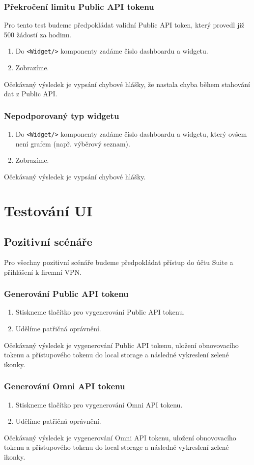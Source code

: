 \documentclass[czech, bc, kiv, he, iso690numb]{fasthesis}
\begin{document}
\subsubsection{Překročení limitu Public API tokenu}
Pro tento test budeme předpokládat validní Public API token, který provedl již 500 žádostí za hodinu.
\begin{enumerate}
	\item Do \texttt{<Widget/>} komponenty zadáme číslo dashboardu a widgetu.
	\item Zobrazíme.
\end{enumerate}
Očekávaný výsledek je vypsání chybové hlášky, že nastala chyba během stahování dat z Public API.

\subsubsection{Nepodporovaný typ widgetu}
\begin{enumerate}
	\item Do \texttt{<Widget/>} komponenty zadáme číslo dashboardu a widgetu, který ovšem není grafem (např. výběrový seznam).
	\item Zobrazíme.
\end{enumerate}
Očekávaný výsledek je vypsání chybové hlášky.

\section{Testování UI}
\subsection{Pozitivní scénáře}
Pro všechny pozitivní scénáře budeme předpokládat přístup do účtu Suite a přihlášení k firemní VPN.
\subsubsection{Generování Public API tokenu}
\begin{enumerate}
	\item Stiskneme tlačítko pro vygenerování Public API tokenu.
	\item Udělíme patřičná oprávnění.
\end{enumerate}
Očekávaný výsledek je vygenerování Public API tokenu, uložení obnovovacího tokenu a přístupového tokenu do local storage a následné vykreslení zelené ikonky.

\subsubsection{Generování Omni API tokenu}
\begin{enumerate}
	\item Stiskneme tlačítko pro vygenerování Omni API tokenu.
	\item Udělíme patřičná oprávnění.
\end{enumerate}
Očekávaný výsledek je vygenerování Omni API tokenu, uložení obnovovacího tokenu a přístupového tokenu do local storage a následné vykreslení zelené ikonky.
\end{document}
